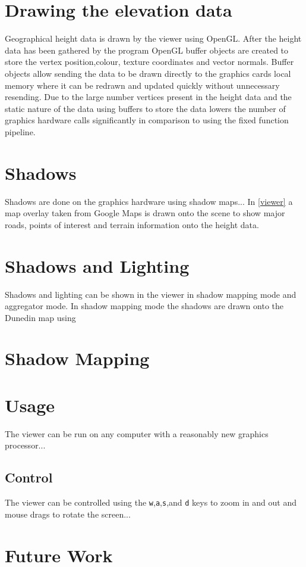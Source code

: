 \documentclass[12pt]{report}
\begin{document}
\section{Drawing the elevation data}
Geographical height data is drawn by the viewer using OpenGL. After the height data has been gathered by the program OpenGL buffer objects are created to store the vertex position,colour, texture coordinates and vector normals. Buffer objects allow sending the data to be drawn directly to the graphics cards local memory where it can be redrawn and updated quickly without unnecessary resending. Due to the large number vertices present in the height data and the static nature of the data using buffers to store the data lowers the number of graphics hardware calls significantly in comparison to using the fixed function pipeline.

\section{Shadows}
Shadows are done on the graphics hardware using shadow maps...
In \ref{viewer} a map overlay taken from Google Maps\cite{gmaps} is drawn onto the scene to show major roads, points of interest and terrain information onto the height data. 
\section{Shadows and Lighting}
Shadows and lighting can be shown in the viewer in shadow mapping mode and aggregator mode. In shadow mapping mode the shadows are drawn onto the Dunedin map using 

\section{Shadow Mapping}

\section{Usage}
The viewer can be run on any computer with a reasonably new graphics processor...
\subsection{Control}
The viewer can be controlled using the \texttt{w},\texttt{a},\texttt{s},and \texttt{d} keys to zoom in and out and mouse drags to rotate the screen...
\section{Future Work}
\end{document}
